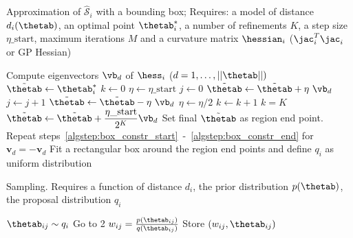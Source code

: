 \begin{algorithm}[!ht]
	\caption{Approximation of $\mathcal{\hat{S}}_i$ with a bounding box; 
  Requires: a model of distance $d_i(\thetab)$, 
  an optimal point $\thetab_i^*$, 
  a number of refinements $K$, 
  a step size $\eta\_\text{start}$, 
  maximum iterations $M$ and 
  a curvature matrix $\hessian_i$ ($\jac_i^T\jac_i $ or GP Hessian)}\label{alg:region_construction}
	\begin{algorithmic}[1]
	\State Compute eigenvectors $\vb_{d}$ of $\hess_i$ {\scriptsize ($d = 1,\ldots,||\thetab ||)$}
		\State $\Tilde{\thetab} \gets \thetab_i^*$ \label{algstep:box_constr_start}
		\State $k \gets 0$
		\State $\eta \gets \eta\_\text{start}$ 
		\Repeat
          \State $j \gets 0$
        	\Repeat
            \State $\Tilde{\thetab} \gets \Tilde{\thetab} + \eta \ \vb_{d}$ 
            \State $j \gets j + 1$
        	 
        	\State $\Tilde{\thetab} \gets \Tilde{\thetab} - \eta \ \vb_{d}$
        	\State $\eta \gets \eta/2$ 
        	\State $k \gets k + 1$
      \Until $k = K$
       
        \State $\Tilde{\thetab} \gets \Tilde{\thetab} + \dfrac{\eta\_{\text{start}}}{2^K} \vb_d$ 
      \EndIf
    	\State Set final $\Tilde{\thetab}$ as region end point. \label{algstep:box_constr_end}
    	\State Repeat steps~\ref{algstep:box_constr_start}~-~\ref{algstep:box_constr_end} for $\mathbf{v}_{d} = - \mathbf{v}_{d}$
	\EndFor
	\State Fit a rectangular box around the region end points and define $q_i$ as uniform distribution
	\end{algorithmic}
\end{algorithm}



\begin{algorithm}[H]
    \centering
    \caption{Sampling. Requires a function of distance $d_i$, the prior distribution $p(\thetab)$, the proposal distribution $q_i$}\label{alg:sampling_GB}
    \begin{algorithmic}[1]
      \State $\thetab_{ij} \sim q_i$
            \State Go to 2 
          \Else {}
            \State $w_{ij} = \frac{p(\thetab_{ij})}{q(\thetab_{ij})}$ 
            \State Store $(w_{ij}, \thetab_{ij})$ 
          \EndIf
    \end{algorithmic}
\end{algorithm}
